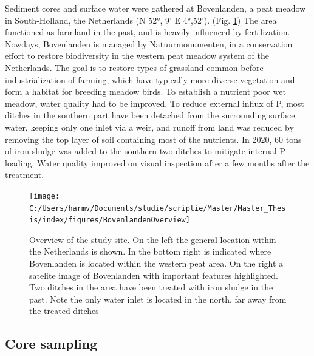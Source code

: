 \documentclass[a4paper,11pt]{article}
\begin{document}
Sediment cores and surface water were gathered at Bovenlanden, a peat meadow in South-Holland, the Netherlands (N 52°, 9' E 4°,52'). (Fig. \ref{fig:BL}) The area functioned as farmland in the past, and is heavily influenced by fertilization. Nowdays, Bovenlanden is managed by Natuurmonumenten, in a conservation effort to restore biodiversity in the western peat meadow system of the Netherlands. The goal is to restore types of grassland common before industrialization of farming, which have typically more diverse vegetation and form a habitat for breeding meadow birds. To establish a nutrient poor wet meadow, water quality had to be improved. To reduce external influx of P, most ditches in the southern part have been detached from the surrounding surface water, keeping only one inlet via a weir, and runoff from land was reduced by removing the top layer of soil containing most of the nutrients. In 2020, 60 tons of iron sludge was added to the southern two ditches to mitigate internal P loading. Water quality improved on visual inspection after a few months after the treatment.
\begin{figure}

{\centering \texttt{[image: C:/Users/harmv/Documents/studie/scriptie/Master/Master\_Thesis/index/figures/BovenlandenOverview]} 

}

\caption{Overview of the study site. On the left  the general location within the Netherlands is shown. In the bottom right is indicated where Bovenlanden is located within the western peat area. On the right a satelite image of Bovenlanden with important features highlighted. Two ditches in the area have been treated with iron sludge in the past. Note the only water inlet is located in the north, far away from the treated ditches}\label{fig:BL}
\end{figure}
\hypertarget{core-sampling}{%
\subsection{Core sampling}\label{core-sampling}}
\end{document}
